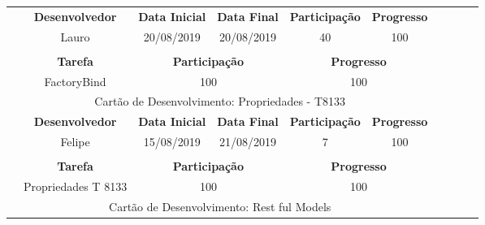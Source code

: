\documentclass[ a4paper, landscape]{article}
\begin{document}
\begin{longtable}{p{0.1cm}c|c|c|c|c|c|c|cp{0.1cm}}
      &\multicolumn{1}{|c|}{\textbf{\textcolor{CDes}{Desenvolvedor}}} 
      &\textbf{\textcolor{CDes}{Data Inicial}} 
      &\textbf{\textcolor{CDes}{Data Final}} 
      &\textbf{\textcolor{CDes}{Participação}} 
      &\multicolumn{1}{c|}{\textbf{\textcolor{CDes}{Progresso}}} \\ [1ex] \cline{2-6} 
      &\multicolumn{1}{|c|}{\textcolor{CDes}{Lauro}}
      &\textcolor{CDes}{20/08/2019}
      &\textcolor{CDes}{20/08/2019}
      &\textcolor{CDes}{40}
      &\multicolumn{1}{c|}{\textcolor{CDes}{100}}\\ [1ex] 
      \cline{2-6}\\ 
      \arrayrulecolor{Tar} 
     \cline{2-6} 
      &\multicolumn{1}{c||}{\textbf{\textcolor{Tar}{Tarefa}}} 
      &\multicolumn{2}{c|}{\textbf{\textcolor{Tar}{Participação}}} 
      &\multicolumn{2}{c}{\textbf{\textcolor{Tar}{Progresso}}} \\ [1ex] \cline{2-6} 
      &\multicolumn{1}{c||}{\textcolor{Tar}{FactoryBind}}
      &\multicolumn{2}{c|}{\textcolor{Tar}{100}}
      &\multicolumn{2}{c}{\textcolor{Tar}{100}}\\ 
\cline{2-6} 
    \multicolumn{6}{c}{ \textcolor{CDes}{ Cartão de Desenvolvimento: Propriedades - T8133}}\\ 
     \cline{2-6} 
      
      &\multicolumn{1}{|c|}{\textbf{\textcolor{CDes}{Desenvolvedor}}} 
      &\textbf{\textcolor{CDes}{Data Inicial}} 
      &\textbf{\textcolor{CDes}{Data Final}} 
      &\textbf{\textcolor{CDes}{Participação}} 
      &\multicolumn{1}{c|}{\textbf{\textcolor{CDes}{Progresso}}} \\ [1ex] \cline{2-6} 
      &\multicolumn{1}{|c|}{\textcolor{CDes}{Felipe}}
      &\textcolor{CDes}{15/08/2019}
      &\textcolor{CDes}{21/08/2019}
      &\textcolor{CDes}{7}
      &\multicolumn{1}{c|}{\textcolor{CDes}{100}}\\ [1ex] 
      \cline{2-6}\\ 
      \arrayrulecolor{Tar} 
     \cline{2-6} 
      &\multicolumn{1}{c||}{\textbf{\textcolor{Tar}{Tarefa}}} 
      &\multicolumn{2}{c|}{\textbf{\textcolor{Tar}{Participação}}} 
      &\multicolumn{2}{c}{\textbf{\textcolor{Tar}{Progresso}}} \\ [1ex] \cline{2-6} 
      &\multicolumn{1}{c||}{\textcolor{Tar}{Propriedades T 8133}}
      &\multicolumn{2}{c|}{\textcolor{Tar}{100}}
      &\multicolumn{2}{c}{\textcolor{Tar}{100}}\\ 
\cline{2-6} 
    \multicolumn{6}{c}{ \textcolor{CDes}{ Cartão de Desenvolvimento: Rest ful Models}}\\ 
     \cline{2-6} 
      

\end{longtable}
\end{document}
